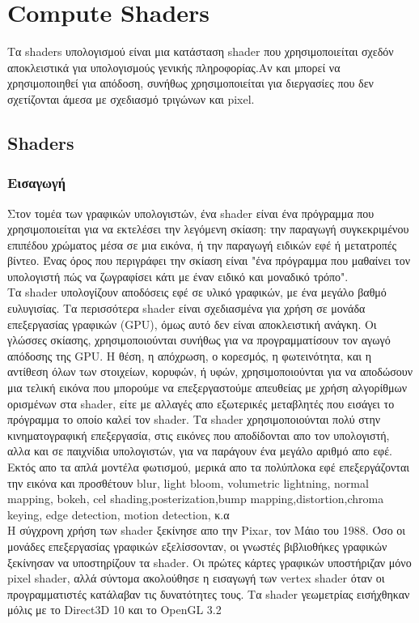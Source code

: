 \section{Compute Shaders}
Τα shaders υπολογισμού είναι μια κατάσταση shader που χρησιμοποιείται σχεδόν αποκλειστικά για υπολογισμούς γενικής πληροφορίας.Αν και μπορεί να χρησιμοποιηθεί για απόδοση, συνήθως χρησιμοποιείται για διεργασίες που δεν σχετίζονται άμεσα με σχεδιασμό τριγώνων και pixel.\cite{computeshaders-1}
\subsection{Shaders}
\subsubsection{Εισαγωγή}
Στον τομέα των γραφικών υπολογιστών, ένα shader είναι ένα πρόγραμμα που χρησιμοποιείται για να εκτελέσει την λεγόμενη σκίαση: την παραγωγή συγκεκριμένου επιπέδου χρώματος μέσα σε μια εικόνα, ή την παραγωγή ειδικών εφέ ή μετατροπές βίντεο. Ένας όρος που περιγράφει την σκίαση είναι "ένα πρόγραμμα που μαθαίνει τον υπολογιστή πώς να ζωγραφίσει κάτι με έναν ειδικό και μοναδικό τρόπο".\\
Τα shader υπολογίζουν αποδόσεις εφέ σε υλικό γραφικών, με ένα μεγάλο βαθμό ευλυγισίας. Τα περισσότερα shader είναι σχεδιασμένα για χρήση σε μονάδα επεξεργασίας γραφικών (GPU), όμως αυτό δεν είναι αποκλειστική ανάγκη. Οι γλώσσες σκίασης, χρησιμοποιούνται συνήθως για να προγραμματίσουν τον αγωγό απόδοσης της GPU. Η θέση, η απόχρωση, ο κορεσμός, η φωτεινότητα, και η αντίθεση όλων των στοιχείων, κορυφών, ή υφών, χρησιμοποιούνται για να αποδώσουν μια τελική εικόνα που μπορούμε να επεξεργαστούμε απευθείας με χρήση αλγορίθμων ορισμένων στα shader, είτε με αλλαγές απο εξωτερικές μεταβλητές που εισάγει το πρόγραμμα το οποίο καλεί τον shader.
Τα shader χρησιμοποιούνται πολύ στην κινηματογραφική επεξεργασία, στις εικόνες που αποδίδονται απο τον υπολογιστή, αλλα και σε παιχνίδια υπολογιστών, για να παράγουν ένα μεγάλο αριθμό απο εφέ. Εκτός απο τα απλά μοντέλα φωτισμού, μερικά απο τα πολύπλοκα εφέ επεξεργάζονται την εικόνα και προσθέτουν blur, light bloom, volumetric lightning, normal mapping, bokeh, cel shading,posterization,bump mapping,distortion,chroma keying, edge detection, motion detection, κ.α\\
Η σύγχρονη χρήση των shader ξεκίνησε απο την Pixar, τον Μάιο του 1988. Όσο οι μονάδες επεξεργασίας γραφικών εξελίσσονταν, οι γνωστές βιβλιοθήκες γραφικών ξεκίνησαν να υποστηρίζουν τα shader. Οι πρώτες κάρτες γραφικών υποστήριζαν μόνο pixel shader, αλλά σύντομα ακολούθησε η εισαγωγή των vertex shader όταν οι προγραμματιστές κατάλαβαν τις δυνατότητες τους. Τα shader γεωμετρίας εισήχθηκαν μόλις με το Direct3D 10 και το OpenGL 3.2
